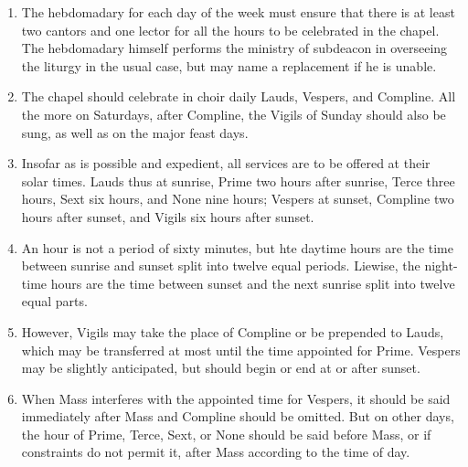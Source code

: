 \begin{enumerate}
			\item The hebdomadary for each day of the week must ensure that there is at least two cantors and one lector for all the hours to be celebrated in the chapel. The hebdomadary himself performs the ministry of subdeacon in overseeing the liturgy in the usual case, but may name a replacement if he is unable.
			
				
		\item The chapel should celebrate in choir daily Lauds, Vespers, and Compline. All the more on Saturdays, after Compline, the Vigils of Sunday should also be sung, as well as on the major feast days.
		
		\item Insofar as is possible and expedient, all services are to be offered at their solar times. Lauds thus at sunrise, Prime two hours after sunrise, Terce three hours, Sext six hours, and None nine hours; Vespers at sunset, Compline two hours after sunset, and Vigils six hours after sunset.
		
		\item An hour is not a period of sixty minutes, but hte daytime hours are the time between sunrise and sunset split into twelve equal periods. Liewise, the night-time hours are the time between sunset and the next sunrise split into twelve equal parts.
		
		\item However, Vigils may take the place of Compline or be prepended to Lauds, which may be transferred at most until the time appointed for Prime. Vespers may be slightly anticipated, but should begin or end at or after sunset.
		
		\item When Mass interferes with the appointed time for Vespers, it should be said immediately after Mass and Compline should be omitted. But on other days, the hour of Prime, Terce, Sext, or None should be said before Mass, or if constraints do not permit it, after Mass according to the time of day.
		\end{enumerate}

